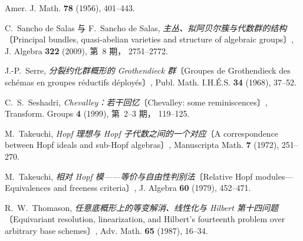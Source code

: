 \begin{description}
  Amer. J. Math. \textbf{78} (1956), 401--443.
\item[{[SS09]}]\label{bib:sga3-VIB-SS09}%
  C.~Sancho de Salas 与 F.~Sancho de Salas,
  \emph{主丛、拟阿贝尔簇与代数群的结构}〔Principal bundles, quasi-abelian varieties and
  structure of algebraic groups〕,
  J. Algebra \textbf{322} (2009), 第~8 期， 2751--2772.
\item[{[Se68]}]\label{bib:sga3-VIB-Se68}%
  J.-P.~Serre,
  \emph{分裂约化群概形的 Grothendieck 群}〔Groupes de Grothendieck des sch\'emas en groupes
  r\'eductifs d\'eploy\'es〕,
  Publ. Math. I.H.\'E.S. \textbf{34} (1968), 37--52.
\item[{[Se99]}]\label{bib:sga3-VIB-Se99}%
  C.~S.~Seshadri,
  \emph{Chevalley：若干回忆}〔Chevalley: some reminiscences〕,
  Transform. Groups \textbf{4} (1999), 第~2--3 期， 119--125.
\item[{[Ta72]}]\label{bib:sga3-VIB-Ta72}%
  M.~Takeuchi,
  \emph{Hopf 理想与 Hopf 子代数之间的一个对应}〔A correspondence between Hopf ideals and sub-Hopf
  algebras〕,
  Manuscripta Math. \textbf{7} (1972), 251--270.
\item[{[Ta79]}]\label{bib:sga3-VIB-Ta79}%
  M.~Takeuchi,
  \emph{相对 Hopf 模——等价与自由性判别法}〔Relative Hopf modules---Equivalences and freeness
  criteria〕,
  J. Algebra \textbf{60} (1979), 452--471.
\item[{[Th87]}]\label{bib:sga3-VIB-Th87}%
  R.~W.~Thomason,
  \emph{任意底概形上的等变解消、线性化与 Hilbert 第十四问题}〔Equivariant resolution, linearization, and Hilbert's
  fourteenth problem over arbitrary base schemes〕,
  Adv. Math. \textbf{65} (1987), 16--34.
\end{description}

